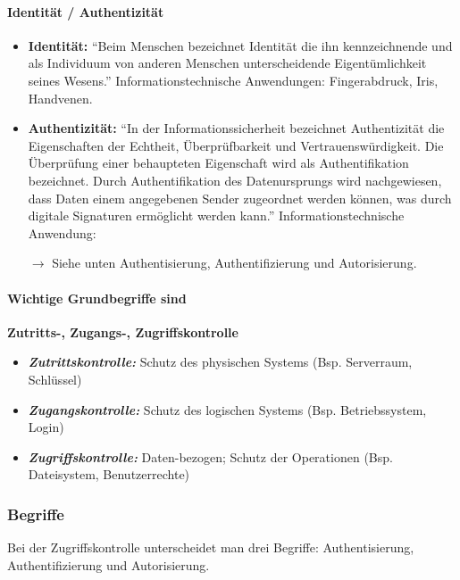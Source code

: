 \paragraph*{Identität / Authentizität}\label{par:IdentityAuthenticity}
\begin{itemize}
    \item \textbf{Identität:} "`Beim Menschen bezeichnet Identität die ihn kennzeichnende und als Individuum von anderen Menschen unterscheidende Eigentümlichkeit seines Wesens."'\cite{wiki} Informationstechnische Anwendungen: Fingerabdruck, Iris, Handvenen.
    \item \textbf{Authentizität:} "`In der Informationssicherheit bezeichnet Authentizität die Eigenschaften der Echtheit, Überprüfbarkeit und Vertrauenswürdigkeit. Die Überprüfung einer behaupteten Eigenschaft wird als Authentifikation bezeichnet. Durch Authentifikation des Datenursprungs wird nachgewiesen, dass Daten einem angegebenen Sender zugeordnet werden können, was durch digitale Signaturen ermöglicht werden kann."'\cite{wiki} Informationstechnische Anwendung:
    \item[$\rightarrow$] Siehe unten Authentisierung, Authentifizierung und Autorisierung.
\end{itemize}

\paragraph*{Wichtige Grundbegriffe sind}\textbf{Zutritts-, Zugangs-, Zugriffskontrolle}
\begin{itemize}
    \item \textbf{\textsl{Zutrittskontrolle: }}Schutz des physischen Systems (Bsp. Serverraum, Schlüssel)
    \item \textbf{\textsl{Zugangskontrolle: }}Schutz des logischen Systems (Bsp. Betriebssystem, Login)
    \item \textbf{\textsl{Zugriffskontrolle: }}Daten-bezogen; Schutz der Operationen (Bsp. Dateisystem, Benutzerrechte)
\end{itemize}

\subsubsection*{Begriffe}Bei der Zugriffskontrolle unterscheidet man drei Begriffe: Authentisierung, Authentifizierung und Autorisierung.

